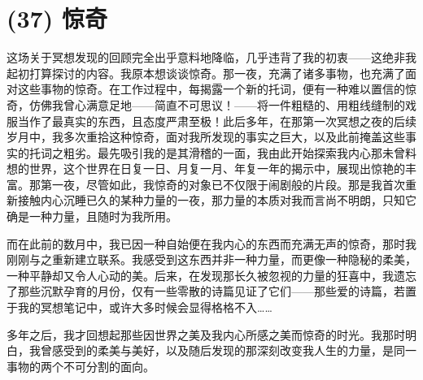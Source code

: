\section{(37) 惊奇}

这场关于冥想发现的回顾完全出乎意料地降临，几乎违背了我的初衷——这绝非我起初打算探讨的内容。我原本想谈谈惊奇。那一夜，充满了诸多事物，也充满了面对这些事物的惊奇。在工作过程中，每揭露一个新的托词，便有一种难以置信的惊奇，仿佛我曾心满意足地——简直不可思议！——将一件粗糙的、用粗线缝制的戏服当作了最真实的东西，且态度严肃至极！此后多年，在那第一次冥想之夜的后续岁月中，我多次重拾这种惊奇，面对我所发现的事实之巨大，以及此前掩盖这些事实的托词之粗劣。最先吸引我的是其滑稽的一面，我由此开始探索我内心那未曾料想的世界，这个世界在日复一日、月复一月、年复一年的揭示中，展现出惊艳的丰富。那第一夜，尽管如此，我惊奇的对象已不仅限于闹剧般的片段。那是我首次重新接触内心沉睡已久的某种力量的一夜，那力量的本质对我而言尚不明朗，只知它确是一种力量，且随时为我所用。

而在此前的数月中，我已因一种自始便在我内心的东西而充满无声的惊奇，那时我刚刚与之重新建立联系。我感受到这东西并非一种力量，而更像一种隐秘的柔美，一种平静却又令人心动的美。后来，在发现那长久被忽视的力量的狂喜中，我遗忘了那些沉默孕育的月份，仅有一些零散的诗篇见证了它们——那些爱的诗篇，若置于我的冥想笔记中，或许大多时候会显得格格不入……

多年之后，我才回想起那些因世界之美及我内心所感之美而惊奇的时光。我那时明白，我曾感受到的柔美与美好，以及随后发现的那深刻改变我人生的力量，是同一事物的两个不可分割的面向。

